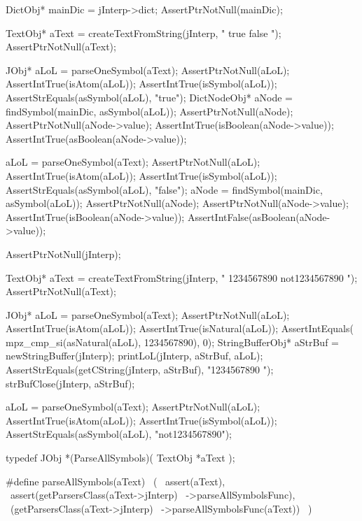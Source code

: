   DictObj* mainDic = jInterp->dict;
  AssertPtrNotNull(mainDic);

  TextObj* aText =
    createTextFromString(jInterp, " true false ");
  AssertPtrNotNull(aText);

  JObj* aLoL = parseOneSymbol(aText);
  AssertPtrNotNull(aLoL);
  AssertIntTrue(isAtom(aLoL));
  AssertIntTrue(isSymbol(aLoL));
  AssertStrEquals(asSymbol(aLoL), "true");
  DictNodeObj* aNode =
    findSymbol(mainDic, asSymbol(aLoL));
  AssertPtrNotNull(aNode);
  AssertPtrNotNull(aNode->value);
  AssertIntTrue(isBoolean(aNode->value));
  AssertIntTrue(asBoolean(aNode->value));

  aLoL = parseOneSymbol(aText);
  AssertPtrNotNull(aLoL);
  AssertIntTrue(isAtom(aLoL));
  AssertIntTrue(isSymbol(aLoL));
  AssertStrEquals(asSymbol(aLoL), "false");
  aNode = findSymbol(mainDic, asSymbol(aLoL));
  AssertPtrNotNull(aNode);
  AssertPtrNotNull(aNode->value);
  AssertIntTrue(isBoolean(aNode->value));
  AssertIntFalse(asBoolean(aNode->value));
\stopCTest
\stopTestCase

\startCTest
  AssertPtrNotNull(jInterp);

  TextObj* aText =
    createTextFromString(jInterp, " 1234567890 not1234567890 ");
  AssertPtrNotNull(aText);

  JObj* aLoL = parseOneSymbol(aText);
  AssertPtrNotNull(aLoL);
  AssertIntTrue(isAtom(aLoL));
  AssertIntTrue(isNatural(aLoL));
  AssertIntEquals( mpz_cmp_si(asNatural(aLoL), 1234567890), 0);
  StringBufferObj* aStrBuf = newStringBuffer(jInterp);
  printLoL(jInterp, aStrBuf, aLoL);
  AssertStrEquals(getCString(jInterp, aStrBuf), "1234567890 ");
  strBufClose(jInterp, aStrBuf);

  aLoL = parseOneSymbol(aText);
  AssertPtrNotNull(aLoL);
  AssertIntTrue(isAtom(aLoL));
  AssertIntTrue(isSymbol(aLoL));
  AssertStrEquals(asSymbol(aLoL), "not1234567890");
\stopCTest
\stopTestCase
\stopTestSuite


\startCHeader
typedef JObj *(ParseAllSymbols)(
  TextObj *aText
);

#define parseAllSymbols(aText)              \
  (                                         \
    assert(aText),                          \
    assert(getParsersClass(aText->jInterp)  \
      ->parseAllSymbolsFunc),               \
    (getParsersClass(aText->jInterp)        \
      ->parseAllSymbolsFunc(aText))         \
  )
\stopCHeader

